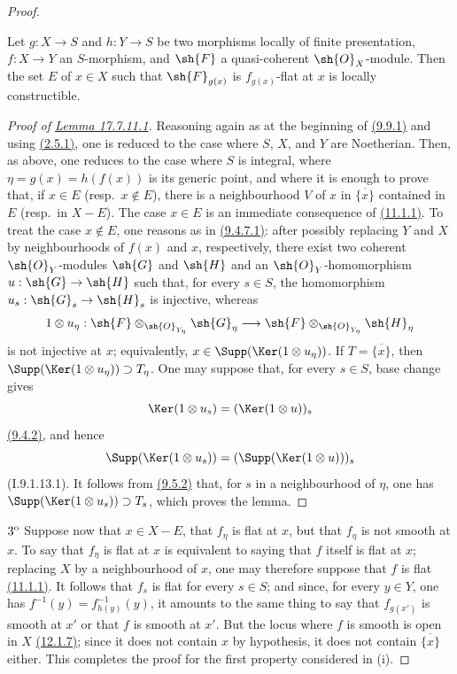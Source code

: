 \begin{proof}
\begin{lemma}[17.7.11.1]
\label{IV.17.7.11.1}
Let $g:X\to S$ and $h:Y\to S$ be two morphisms locally of finite presentation, $f:X\to Y$ an $S$-morphism, and $\sh{F}$ a quasi-coherent $\sh{O}_X$-module.
Then the set $E$ of $x\in X$ such that $\sh{F}_{g(x)}$ is $f_{g(x)}$-flat at $x$ is locally constructible.
\end{lemma}

\begin{proof}[Proof of {\hyperlink{ega4.c04.lem.17-7-11-1}{Lemma 17.7.11.1}}]
Reasoning again as at the beginning of {\hyperlink{ega4.c04.prop.9-9-1}{(9.9.1)}} and using {\hyperlink{ega4.c04.prop.2-5-1}{(2.5.1)}}, one is reduced to the case where $S$, $X$, and $Y$ are Noetherian.
Then, as above, one reduces to the case where $S$ is integral, where $\eta=g(x)=h(f(x))$ is its generic point, and where it is enough to prove that, if $x\in E$ (resp.\ $x\notin E$), there is a neighbourhood $V$ of $x$ in $\overline{\{x\}}$ contained in $E$ (resp.\ in $X-E$).
The case $x\in E$ is an immediate consequence of {\hyperlink{ega4.c04.thm.11-1-1}{(11.1.1)}}.
To treat the case $x\notin E$, one reasons as in {\hyperlink{ega4.c04.lem.9-4-7-1}{(9.4.7.1)}}: after possibly replacing $Y$ and $X$ by neighbourhoods of $f(x)$ and $x$, respectively, there exist two coherent $\sh{O}_Y$-modules $\sh{G}$ and $\sh{H}$ and an $\sh{O}_Y$-homomorphism $u:\sh{G}\to\sh{H}$ such that, for every $s\in S$, the homomorphism $u_s:\sh{G}_s\to\sh{H}_s$ is injective, whereas
\[
1\otimes u_\eta:\sh{F}\otimes_{\sh{O}_{Y_\eta}}\sh{G}_\eta
\longrightarrow
\sh{F}\otimes_{\sh{O}_{Y_\eta}}\sh{H}_\eta
\]
is not injective at $x$; equivalently, $x\in\Supp(\Ker(1\otimes u_\eta))$.
If $T=\overline{\{x\}}$, then $\Supp(\Ker(1\otimes u_\eta))\supset T_\eta$.
One may suppose that, for every $s\in S$, base change gives
\[
\Ker(1\otimes u_s)=(\Ker(1\otimes u))_s
\]
{\hyperlink{ega4.c04.prop.9-4-2}{(9.4.2)}}, and hence
\[
\Supp(\Ker(1\otimes u_s))=(\Supp(\Ker(1\otimes u)))_s
\]
(I.9.1.13.1).
It follows from {\hyperlink{ega4.c04.cor.9-5-2}{(9.5.2)}} that, for $s$ in a neighbourhood of $\eta$, one has $\Supp(\Ker(1\otimes u_s))\supset T_s$, which proves the lemma.
\end{proof}

$3\textsuperscript{o}$ Suppose now that $x\in X-E$, that $f_\eta$ is flat at $x$, but that $f_\eta$ is not smooth at $x$.
To say that $f_\eta$ is flat at $x$ is equivalent to saying that $f$ itself is flat at $x$; replacing $X$ by a neighbourhood of $x$, one may therefore suppose that $f$ is flat {\hyperlink{ega4.c04.thm.11-1-1}{(11.1.1)}}.
It follows that $f_s$ is flat for every $s\in S$; and since, for every $y\in Y$, one has $f^{-1}(y)=f_{h(y)}^{-1}(y)$, it amounts to the same thing to say that $f_{g(x')}$ is smooth at $x'$ or that $f$ is smooth at $x'$.
But the locus where $f$ is smooth is open in $X$ {\hyperlink{ega4.c04.cor.12-1-7}{(12.1.7)}}; since it does not contain $x$ by hypothesis, it does not contain $\overline{\{x\}}$ either.
This completes the proof for the first property considered in (i).


\end{proof}
